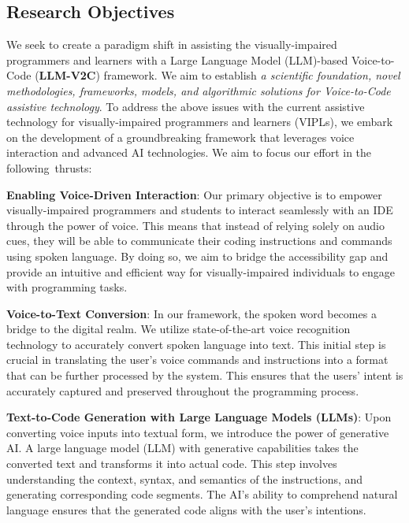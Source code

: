 \subsection{Research Objectives}


We seek to create a paradigm shift in assisting the visually-impaired
programmers and learners with a Large Language Model
(LLM)-based Voice-to-Code ({\bf LLM-V2C}) framework. We aim to establish {\em
  a scientific foundation, novel methodologies, frameworks, models,
  and algorithmic solutions for Voice-to-Code assistive technology}.
%
To address the above issues with the current assistive technology for
visually-impaired programmers and learners (VIPLs), we embark
on the development of a groundbreaking framework that leverages voice
interaction and advanced AI technologies. We aim to focus our effort
in the following~thrusts:

{\bf Enabling Voice-Driven Interaction}: Our primary objective is to
empower visually-impaired programmers and students to interact
seamlessly with an IDE through the power of voice. This means that
instead of relying solely on audio cues, they will be able to
communicate their coding instructions and commands using spoken
language. By doing so, we aim to bridge the accessibility gap and
provide an intuitive and efficient way for visually-impaired
individuals to engage with programming tasks.

{\bf Voice-to-Text Conversion}: In our framework, the spoken word
becomes a bridge to the digital realm. We utilize state-of-the-art
voice recognition technology to accurately convert spoken language
into text. This initial step is crucial in translating the user's
voice commands and instructions into a format that can be further
processed by the system. This ensures that the users' intent is
accurately captured and preserved throughout the programming process.

{\bf Text-to-Code Generation with Large Language Models (LLMs)}: Upon converting
voice inputs into textual form, we introduce the power of generative
AI. A large language model (LLM) with
generative capabilities takes the converted text and transforms it
into actual code. This step involves understanding the context,
syntax, and semantics of the instructions, and generating
corresponding code segments. The AI's ability to comprehend natural
language ensures that the generated code aligns with the user's
intentions.

